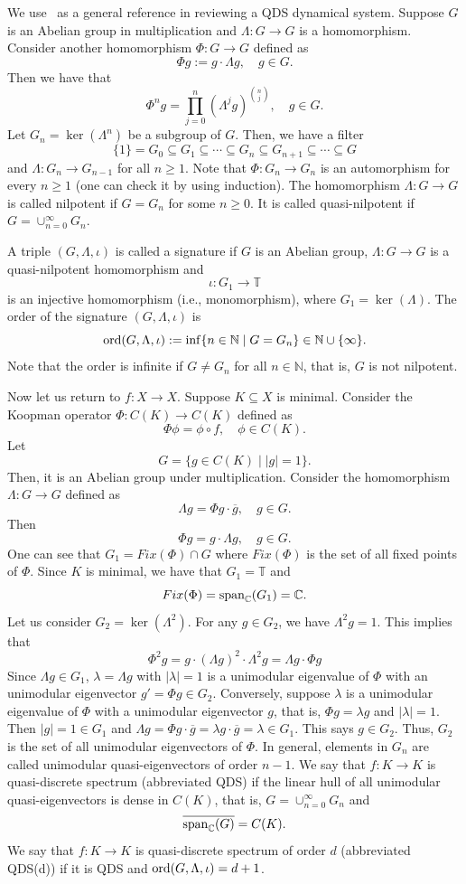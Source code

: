 \documentclass[12pt,letterpaper]{amsart}
\newcommand {\C} {{\mathbb C}}
\newcommand {\N} {{\mathbb N}}
\newcommand {\TT} {{\mathbb T}}
\begin{document}
We use~\cite{HM} as a general reference in reviewing a QDS dynamical system. Suppose $G$ is an Abelian group in multiplication and $\Lambda: G\to G$ is a homomorphism. Consider another homomorphism $\Phi: G\to G$ defined as 
$$
\Phi g :=g\cdot \Lambda g, \quad g\in G.
$$
Then we have that
$$
\Phi^{n} g = \prod_{j=0}^{n} (\Lambda^{j} g)^{\binom{n}{j}}, \quad g\in G.
$$
Let $G_{n} =\ker (\Lambda^{n})$ be a subgroup of $G$. Then, we have a filter 
$$
\{ 1\}=G_{0}\subseteq G_{1}\subseteq \cdots \subseteq G_{n} \subseteq G_{n+1}\subseteq \cdots \subseteq G
$$
and $\Lambda: G_{n}\to G_{n-1}$ for all $n\geq 1$. Note that $\Phi: G_{n}\to G_{n}$ is an automorphism for every $n\geq 1$ (one can check it by using induction).
The homomorphism $\Lambda: G\to G$ is called nilpotent if $G=G_{n}$ for some $n\geq 0$. It is called quasi-nilpotent if $G=\cup_{n=0}^{\infty} G_{n}$.

A triple $(G, \Lambda, \iota)$ is called a signature if $G$ is an Abelian group, $\Lambda: G\to G$ is a quasi-nilpotent homomorphism and 
$$
\iota : G_{1}\to \TT
$$
is an injective homomorphism (i.e., monomorphism), where $G_{1}=\ker(\Lambda)$. The order of the signature $(G, \Lambda, \iota)$ is 
$$
{\rm ord} (G, \Lambda, \iota) := \inf \{ n\in \N\;|\; G=G_{n}\}\in \N\cup \{\infty\}.
$$ 
Note that the order is infinite if $G\not= G_{n}$ for all $n\in \N$, that is, $G$ is not nilpotent.

Now let us return to $f: X\to X$. Suppose $K\subseteq X$ is minimal. Consider the Koopman operator $\Phi: C (K) \to C (K)$ defined as 
$$
\Phi \phi = \phi\circ f, \quad \phi \in C(K). 
$$
Let
$$
G= \{ g\in C(K)\;|\; |g|=1\}.
$$ 
Then, it is an Abelian group under multiplication. Consider the homomorphism $\Lambda: G\to G$ defined as
$$
\Lambda g = \Phi g\cdot \overline{g}, \quad g\in G. 
$$
Then 
$$
\Phi g= g\cdot \Lambda g, \quad g\in G.
$$
One can see that $G_{1} = Fix (\Phi) \cap G$ where $Fix(\Phi)$ is the set of all fixed points of $\Phi$. 
Since $K$ is minimal, we have that $G_{1}={\mathbb T}$ and 
$$
Fix(\Phi) ={\rm span}_{\C} (G_{1})=\C.
$$ 
Let us consider $G_{2}=\ker (\Lambda^{2})$. For any $g\in G_{2}$, we have $\Lambda^{2}g=1$. This implies that 
$$
\Phi^{2} g = g \cdot (\Lambda g)^{2} \cdot\Lambda^{2} g= \Lambda g\cdot \Phi g
$$
Since $\Lambda g\in G_{1}$, $\lambda =\Lambda g$ with $|\lambda|=1$ is a unimodular eigenvalue of $\Phi$ with an unimodular eigenvector $g'=\Phi g\in G_{2}$. Conversely, suppose $\lambda$ is a unimodular eigenvalue of $\Phi$ with a unimodular eigenvector $g$, that is, $\Phi g=\lambda g$ and $|\lambda|=1$. Then $|g|=1 \in G_{1}$ and $\Lambda g =\Phi g\cdot \overline{g}=\lambda g\cdot \overline{g}=\lambda \in G_{1}$. This says $g\in G_{2}$. Thus, $G_{2}$ is the set of all unimodular eigenvectors of $\Phi$. In general, elements in $G_{n}$ are called unimodular quasi-eigenvectors of order $n-1$. We say that $f: K\to K$ is quasi-discrete spectrum (abbreviated QDS) if the linear hull of all unimodular quasi-eigenvectors is dense in $C(K)$, that is, $G=\cup_{n=0}^{\infty} G_{n}$ and 
$$
\overline{{\rm span}_{\C} (G)} = C(K).
$$
We say that $f: K\to K$ is quasi-discrete spectrum of order $d$ (abbreviated QDS(d)) if it is QDS and ${\rm ord} (G, \Lambda, \iota)=d+1$. 
\end{document}
